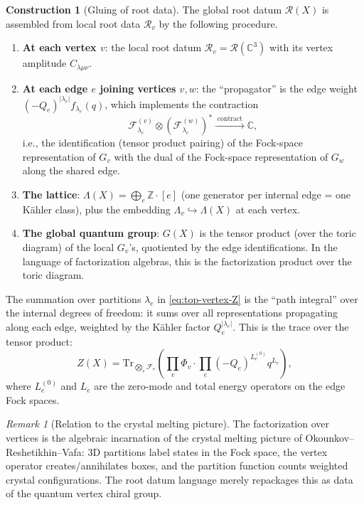 \documentclass[11pt]{amsart}
\theoremstyle{plain}
\theoremstyle{definition}
\newtheorem{construction}[theorem]{Construction}
\theoremstyle{remark}
\newtheorem{remark}[theorem]{Remark}
\newcommand{\cF}{\mathcal{F}}
\begin{document}
\begin{construction}[Gluing of root data]
\label{constr:gluing}
The global root datum $\mathcal{R}(X)$ is assembled from local root data
$\mathcal{R}_v$ by the following procedure.

\begin{enumerate}[label=(\roman*)]
 \item \textbf{At each vertex $v$}: the local root datum $\mathcal{R}_v =
 \mathcal{R}(\mathbb{C}^3)$ with its vertex amplitude $C_{\lambda\mu\nu}$.
 \item \textbf{At each edge $e$ joining vertices $v, w$}: the ``propagator''
 is the edge weight $(-Q_e)^{|\lambda_e|} f_{\lambda_e}(q)$, which
 implements the contraction
 \[
 \cF^{(v)}_{\lambda_e} \otimes (\cF^{(w)}_{\lambda_e})^*
 \xrightarrow{\;\mathrm{contract}\;} \mathbb{C},
 \]
 i.e., the identification (tensor product pairing) of the Fock-space
 representation of $G_v$ with the dual of the Fock-space representation
 of $G_w$ along the shared edge.
 \item \textbf{The lattice}: $\Lambda(X) = \bigoplus_e \mathbb{Z} \cdot [e]$
 (one generator per internal edge = one K\"ahler class), plus the
 embedding $\Lambda_v \hookrightarrow \Lambda(X)$ at each vertex.
 \item \textbf{The global quantum group}: $G(X)$ is the tensor product
 (over the toric diagram) of the local $G_v$'s, quotiented by the
 edge identifications. In the language of factorization algebras,
 this is the factorization product over the toric diagram.
\end{enumerate}

The summation over partitions $\lambda_e$ in \eqref{eq:top-vertex-Z}
is the ``path integral'' over the internal degrees of freedom: it sums
over all representations propagating along each edge, weighted by the
K\"ahler factor $Q_e^{|\lambda_e|}$. This is the trace over the tensor
product:
\begin{equation}\label{eq:gluing-trace}
 Z(X) = \mathrm{Tr}_{\bigotimes_e \cF_e}
 \left( \prod_v \Phi_v \cdot \prod_e (-Q_e)^{L_e^{(0)}} q^{L_e} \right),
\end{equation}
where $L_e^{(0)}$ and $L_e$ are the zero-mode and total energy operators on the
edge Fock spaces.
\end{construction}

\begin{remark}[Relation to the crystal melting picture]
The factorization over vertices is the algebraic incarnation of the crystal
melting picture of Okounkov--Reshetikhin--Vafa: 3D partitions label states
in the Fock space, the vertex operator creates/annihilates boxes, and the
partition function counts weighted crystal configurations. The root datum
language merely repackages this as data of the quantum vertex chiral group.
\end{remark}
\end{document}
